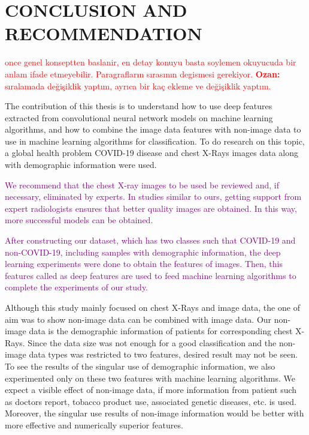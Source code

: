 \chapter{CONCLUSION AND RECOMMENDATION}
\label{ch:CH7}

\textcolor{red}{once genel konseptten baslanir, en detay konuyu basta soylemen okuyucuda bir anlam ifade etmeyebilir. Paragrafların sırasının degismesi gerekiyor. \textbf{Ozan:} sıralamada değişiklik yaptım, ayrıca bir kaç ekleme ve değişiklik yaptım.}

The contribution of this thesis is to understand how to use deep features extracted from convolutional neural network models on machine learning algorithms, and how to combine the image data features with non-image data to use in machine learning algorithms for classification. To do research on this topic, a global health problem COVID-19 disease and chest X-Rays images data along with demographic information were used.

\begin{comment}
The main scope of this thesis was to show an approach on how to use image data without segmenting or manually extracting features to embed them into machine learning algorithms, and afterwards to apply it on a continuing global public health problem.
\end{comment}

\textcolor{purple}{
We recommend that the chest X-ray images to be used be reviewed and, if necessary, eliminated by experts. In studies similar to ours, getting support from expert radiologists ensures that better quality images are obtained. In this way, more successful models can be obtained.}

\textcolor{purple}{After constructing our dataset, which has two classes such that COVID-19 and non-COVID-19, including samples with demographic information, the deep learning experiments were done to obtain the features of images. Then, this features called as deep features are used to feed machine learning algorithms to complete the experiments of our study.}

Although this study mainly focused on chest X-Rays and image data, the one of aim was to show non-image data can be combined with image data. Our non-image data is the demographic information of patients for corresponding chest X-Rays. Since the data size was not enough for a good classification and the non-image data types was restricted to two features, desired result may not be seen. To see the results of the singular use of demographic information, we also experimented only on these two features with machine learning algorithms. We expect a visible effect of non-image data, if more information from patient such as doctors report, tobacco product use, associated genetic diseases, etc. is used. Moreover, the singular use results of non-image information would be better with more effective and numerically superior features.

